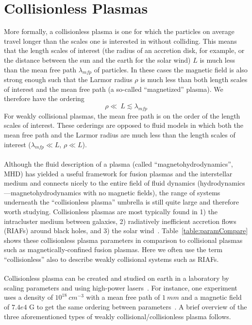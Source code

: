 \section{Collisionless Plasmas}
More formally, a collisionless plasma is one for which the particles on average travel longer than the scales one is interested in without colliding. This means that the length scales of interest (the radius of an accretion disk, for example, or the distance between the sun and the earth for the solar wind) $L$ is much less than the mean free path $\lambda_{mfp}$ of particles. In these cases the magnetic field is also strong enough such that the Larmor radius $\rho$ is much less than both length scales of interest and the mean free path (a so-called ``magnetized'' plasma). We therefore have the ordering
\begin{equation}\label{eq:collLessOrdering}
  \rho\ll\ L \lesssim \lambda_{mfp}
\end{equation}
For weakly collisional plasmas, the mean free path is on the order of the length scales of interest. These orderings are opposed to fluid models in which both the mean free path and the Larmor radius are much less than the length scales of interest ($\lambda_{mfp}\ll L$, $\rho\ll L$). \\
\\
Although the fluid description of a plasma (called ``magnetohydrodynamics'', MHD) has yielded a useful framework for fusion plasmas and the interstellar medium and connects nicely to the entire field of fluid dynamics (hydrodynamics---magnetohydrodynamics with no magnetic fields), the range of systems underneath the ``collisionless plasma'' umbrella is still quite large and therefore worth studying. Collisionless plasmas are most typically found in 1) the intracluster medium between galaxies, 2) radiatively inefficient accretion flows (RIAFs) around black holes, and 3) the solar wind~\cite{Kunz2010}. Table~\ref{table:paramCompare} shows these collisionless plasma parameters in comparison to collisional plasmas such as magnetically-confined fusion plasmas. Here we often use the term ``collisionless'' also to describe weakly collisional systems such as RIAFs. \\
\\
Collisionless plasma can be created and studied on earth in a laboratory by scaling parameters and using high-power lasers~\cite{Courtois2004,Romagnani2008,Dean1971}. For instance, one experiment uses a density of $10^{18}~cm^{-3}$ with a mean free path of $1~mm$ and a magnetic field of $7.4e4$ G to get the same ordering between parameters~\cite{Courtois2004}. A brief overview of the three aforementioned types of weakly collisional/collisionless plasma follows.\\
